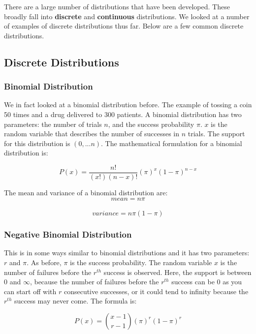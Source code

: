 \documentclass[
]{article}
\begin{document}
There are a large number of distributions that have been developed.
These broadly fall into \textbf{discrete} and \textbf{continuous}
distributions. We looked at a number of examples of discrete
distributions thus far. Below are a few common discrete distributions.

\hypertarget{discrete-distributions}{%
\subsection{Discrete Distributions}\label{discrete-distributions}}

\hypertarget{binomial-distribution}{%
\subsubsection{Binomial Distribution}\label{binomial-distribution}}

We in fact looked at a binomial distribution before. The example of
tossing a coin 50 times and a drug delivered to 300 patients. A binomial
distribution has two parameters: the number of trials \(n\), and the
success probability \(\pi\). \(x\) is the random variable that describes
the number of successes in \(n\) trials. The support for this
distribution is \((0,...n)\). The mathematical formulation for a
binomial distribution is:

\[P(x) = \frac{n!}{(x!)(n-x)!}(\pi)^x(1-\pi)^{n-x}\]

The mean and variance of a binomial distribution are:\\
\[mean = n\pi\]\\
\[variance = n\pi(1-\pi)\]

\hypertarget{negative-binomial-distribution}{%
\subsubsection{Negative Binomial
Distribution}\label{negative-binomial-distribution}}

This is in some ways similar to binomial distributions and it has two
parameters: \(r\) and \(\pi\). As before, \(\pi\) is the success
probability. The random variable \(x\) is the number of failures before
the \(r^{th}\) success is observed. Here, the support is between 0 and
\(\infty\), because the number of failures before the \(r^{th}\) success
can be 0 as you can start off with \(r\) consecutive successes, or it
could tend to infinity because the \(r^{th}\) success may never come.
The formula is:

\[P(x) = \binom{x-1}{r-1}(\pi)^r(1-\pi)^r\]
\end{document}
